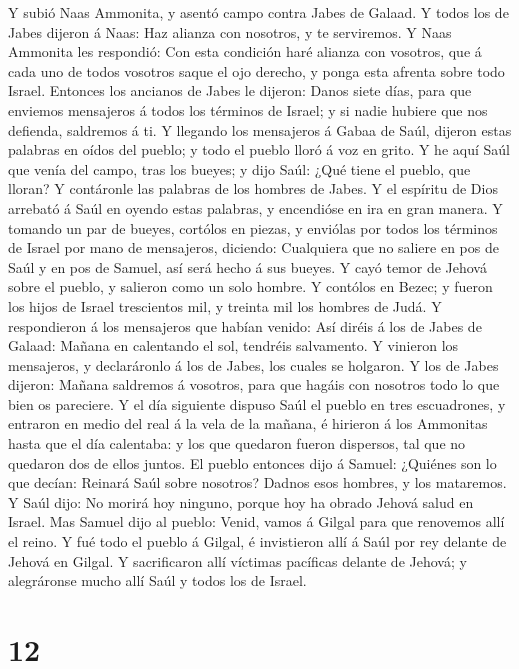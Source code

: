 Y subió Naas Ammonita, y asentó campo contra Jabes de
Galaad. Y todos los de Jabes dijeron á Naas: Haz alianza con nosotros, y
te serviremos.  Y Naas Ammonita les respondió: Con esta
condición haré alianza con vosotros, que á cada uno de todos vosotros
saque el ojo derecho, y ponga esta afrenta sobre todo Israel.
 Entonces los ancianos de Jabes le dijeron: Danos siete
días, para que enviemos mensajeros á todos los términos de Israel; y si
nadie hubiere que nos defienda, saldremos á ti.  Y llegando
los mensajeros á Gabaa de Saúl, dijeron estas palabras en oídos del
pueblo; y todo el pueblo lloró á voz en grito.  Y he aquí
Saúl que venía del campo, tras los bueyes; y dijo Saúl: ¿Qué tiene el
pueblo, que lloran? Y contáronle las palabras de los hombres de Jabes.
 Y el espíritu de Dios arrebató á Saúl en oyendo estas
palabras, y encendióse en ira en gran manera.  Y tomando un
par de bueyes, cortólos en piezas, y enviólas por todos los términos de
Israel por mano de mensajeros, diciendo: Cualquiera que no saliere en
pos de Saúl y en pos de Samuel, así será hecho á sus bueyes. Y cayó
temor de Jehová sobre el pueblo, y salieron como un solo hombre.
 Y contólos en Bezec; y fueron los hijos de Israel
trescientos mil, y treinta mil los hombres de Judá.  Y
respondieron á los mensajeros que habían venido: Así diréis á los de
Jabes de Galaad: Mañana en calentando el sol, tendréis salvamento. Y
vinieron los mensajeros, y declaráronlo á los de Jabes, los cuales se
holgaron.  Y los de Jabes dijeron: Mañana saldremos á
vosotros, para que hagáis con nosotros todo lo que bien os pareciere.
 Y el día siguiente dispuso Saúl el pueblo en tres
escuadrones, y entraron en medio del real á la vela de la mañana, é
hirieron á los Ammonitas hasta que el día calentaba: y los que quedaron
fueron dispersos, tal que no quedaron dos de ellos juntos. 
El pueblo entonces dijo á Samuel: ¿Quiénes son lo que decían: Reinará
Saúl sobre nosotros? Dadnos esos hombres, y los mataremos. 
Y Saúl dijo: No morirá hoy ninguno, porque hoy ha obrado Jehová salud en
Israel.  Mas Samuel dijo al pueblo: Venid, vamos á Gilgal
para que renovemos allí el reino.  Y fué todo el pueblo á
Gilgal, é invistieron allí á Saúl por rey delante de Jehová en Gilgal. Y
sacrificaron allí víctimas pacíficas delante de Jehová; y alegráronse
mucho allí Saúl y todos los de Israel.

\hypertarget{section-11}{%
\section{12}\label{section-11}}

